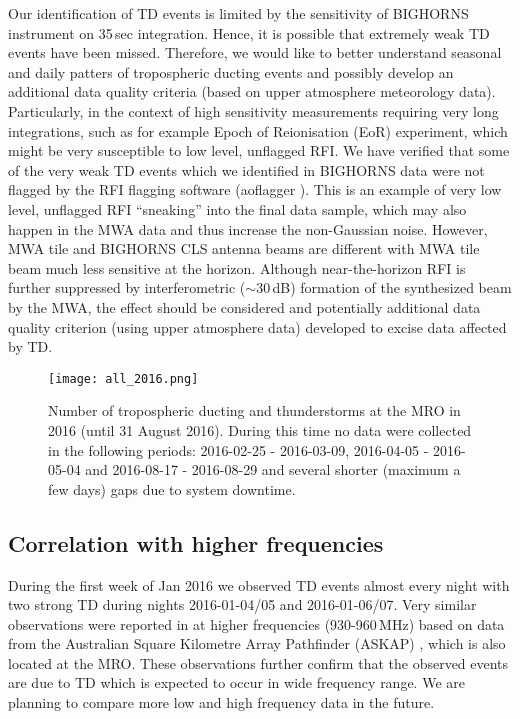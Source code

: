 \documentclass{article}
\begin{document}
Our identification of TD events is limited by the sensitivity of BIGHORNS instrument on 35\,sec integration. Hence, it is possible that extremely weak TD events have been missed.
Therefore, we would like to better understand seasonal and daily patters of tropospheric ducting events and possibly develop an additional data quality criteria (based on upper atmosphere meteorology data). 
Particularly, in the context of high sensitivity measurements requiring very long integrations, such as for example Epoch of Reionisation (EoR) experiment, which might be very susceptible to low level, unflagged RFI.
We have verified that some of the very weak TD events which we identified in BIGHORNS data were not flagged by the RFI flagging software (aoflagger \citep{aoflagger}). 
This is an example of very low level, unflagged RFI ``sneaking'' into the final data sample, which may also happen in the MWA data and thus increase the non-Gaussian noise. However, MWA tile and BIGHORNS CLS antenna beams are different with MWA tile beam much less sensitive at the horizon.
Although near-the-horizon RFI is further suppressed by interferometric ($\sim$30\,dB) formation of the synthesized beam by the MWA, the effect should be considered and potentially additional data quality criterion (using upper atmosphere data) developed to excise data affected by TD.

\begin{figure}[]
\centering
\texttt{[image: all\_2016.png]}
\caption{Number of tropospheric ducting and thunderstorms at the MRO in 2016 (until 31 August 2016). During this time no data were collected in the following periods: 2016-02-25 - 2016-03-09, 2016-04-05 - 2016-05-04 and 2016-08-17 - 2016-08-29 and several shorter (maximum a few days) gaps due to system downtime.}
\label{fig:ducting_2016}
\end{figure}


\subsection{Correlation with higher frequencies}

During the first week of Jan 2016 we observed TD events almost every night with two strong TD during nights 2016-01-04/05 and 2016-01-06/07. Very similar observations were reported in \citep{balt} at higher frequencies (930-960\,MHz) based on data from the Australian Square Kilometre Array Pathfinder (ASKAP) \citep{2007PASA...24..174J}, which is also located at the MRO.
These observations further confirm that the observed events are due to TD which is expected to occur in wide frequency range. We are planning to compare more low and high frequency data in the future.
\end{document}
